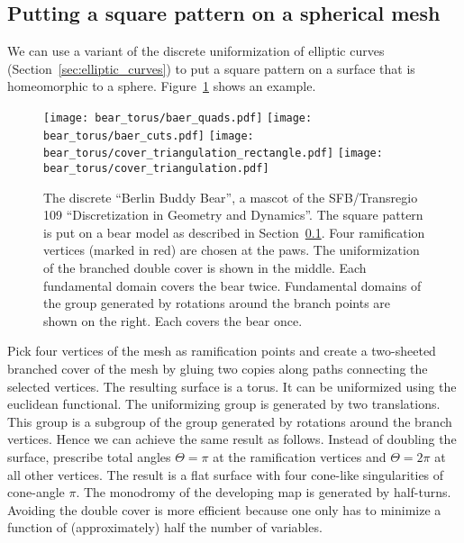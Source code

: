 \documentclass[Thesis]{subfiles}
\begin{document}
\subsection{Putting a square pattern on a spherical mesh}
\label{sec:square_pattern}

We can use a variant of the discrete uniformization of elliptic curves
(Section~\ref{sec:elliptic_curves}) to put a square pattern on a
surface that is homeomorphic to a sphere.  Figure~\ref{fig:bear} shows
an example.
\begin{figure}
  \texttt{[image: bear\_torus/baer\_quads.pdf]}%
  \texttt{[image: bear\_torus/baer\_cuts.pdf]}%
  \hfill%
  \texttt{[image: bear\_torus/cover\_triangulation\_rectangle.pdf]}%
  \hfill%
  \texttt{[image: bear\_torus/cover\_triangulation.pdf]}%
  \caption{The discrete ``Berlin Buddy Bear'', a mascot of the
    SFB/Transregio 109 ``Discretization in Geometry and Dynamics''. 
    The square pattern is put on a bear model as described in
    Section~\ref{sec:square_pattern}. Four ramification vertices (marked
    in red) are chosen at the paws. The uniformization of the branched
    double cover is shown in the middle. Each fundamental domain
    covers the bear twice. Fundamental domains of the
    group generated by rotations around the branch points are shown on
    the right. Each covers the bear once.
  }
  \label{fig:bear}
\end{figure}

Pick four vertices of the mesh as ramification points and create a
two-sheeted branched cover of the mesh by gluing two copies along
paths connecting the selected vertices. The resulting surface is a
torus. It can be uniformized using the euclidean functional. The
uniformizing group is generated by two translations.  This group is a
subgroup of the group generated by rotations around the branch
vertices.  Hence we can achieve the same result as follows. Instead of
doubling the surface, prescribe total angles $\Theta=\pi$ at the
ramification vertices and $\Theta=2\pi$ at all other vertices. The
result is a flat surface with four cone-like singularities of
cone-angle $\pi$. The monodromy of the developing map is generated by
half-turns. Avoiding the double cover is more efficient because one
only has to minimize a function of (approximately) half the number of
variables.
\end{document}
